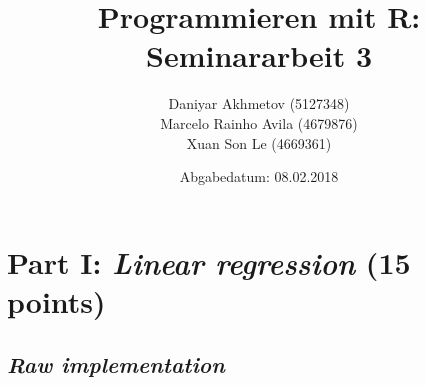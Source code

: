 \documentclass[12,]{article}
\title{Programmieren mit R: Seminararbeit 3}
\author{Daniyar Akhmetov (5127348) \\ Marcelo Rainho Avila (4679876) \\ Xuan Son Le (4669361)}
\date{Abgabedatum: 08.02.2018}
\begin{document}
\maketitle

{
\setcounter{tocdepth}{3}
\tableofcontents
}
\newpage

\section{\texorpdfstring{Part I: \emph{Linear regression} (15
points)}{Part I: Linear regression (15 points)}}\label{part-i-linear-regression-15-points}

\subsection{\texorpdfstring{\emph{Raw
implementation}}{Raw implementation}}\label{raw-implementation}
\end{document}

